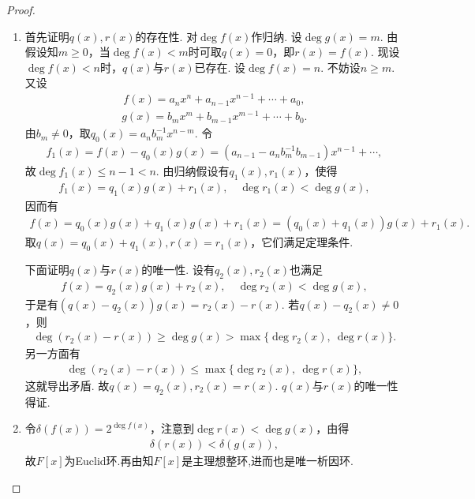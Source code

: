 \documentclass[../../main.tex]{subfiles}%
\begin{document}
\begin{proof}
\begin{enumerate}[(1)]
\item 首先证明$q(x), r(x)$的存在性. 对$\deg f(x)$作归纳. 设$\deg g(x) = m$. 由假设知$m \geqslant 0$，当$\deg f(x) < m$时可取$q(x) = 0$，即$r(x) = f(x)$. 现设$\deg f(x) < n$时，$q(x)$与$r(x)$已存在. 设$\deg f(x) = n$. 不妨设$n \geqslant m$. 又设
\begin{align*}
f(x) = a_nx^n + a_{n-1}x^{n-1} + \cdots + a_0,
\end{align*}
\begin{align*}
g(x) = b_mx^m + b_{m-1}x^{m-1} + \cdots + b_0.
\end{align*}
由$b_m \neq 0$，取$q_0(x) = a_nb_m^{-1}x^{n-m}$. 令
\begin{align*}
f_1(x) = f(x) - q_0(x)g(x) = (a_{n-1} - a_nb_m^{-1}b_{m-1})x^{n-1} + \cdots,
\end{align*}
故$\deg f_1(x) \leqslant n - 1 < n$. 由归纳假设有$q_1(x), r_1(x)$，使得
\begin{align*}
f_1(x) = q_1(x)g(x) + r_1(x),\quad \deg r_1(x) < \deg g(x),
\end{align*}
因而有
\begin{align*}
f(x) = q_0(x)g(x) + q_1(x)g(x) + r_1(x) = (q_0(x) + q_1(x))g(x) + r_1(x).
\end{align*}
取$q(x) = q_0(x) + q_1(x), r(x) = r_1(x)$，它们满足定理条件.

下面证明$q(x)$与$r(x)$的唯一性. 设有$q_2(x), r_2(x)$也满足
\begin{align*}
f(x) = q_2(x)g(x) + r_2(x),\quad \deg r_2(x) < \deg g(x),
\end{align*}
于是有$(q(x) - q_2(x))g(x) = r_2(x) - r(x)$. 若$q(x) - q_2(x) \neq 0$，则
\begin{align*}
\deg(r_2(x) - r(x)) \geqslant \deg g(x) > \max\{\deg r_2(x),\ \deg r(x)\}.
\end{align*}
另一方面有
\begin{align*}
\deg(r_2(x) - r(x)) \leqslant \max\{\deg r_2(x),\ \deg r(x)\},
\end{align*}
这就导出矛盾. 故$q(x) = q_2(x), r_2(x) = r(x)$. $q(x)$与$r(x)$的唯一性得证.

\item 令$\delta(f(x)) = 2^{\deg f(x)}$，注意到$\deg r(x) < \deg g(x)$，由得
\begin{align*}
\delta(r(x)) < \delta(g(x)),
\end{align*}
故$F[x]$为Euclid环.再由知$F[x]$是主理想整环,进而也是唯一析因环.
\end{enumerate}
\end{proof}
\end{document}
